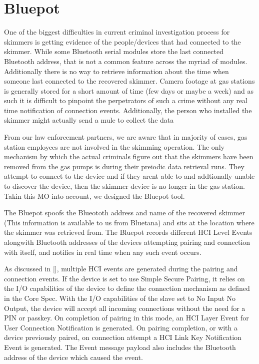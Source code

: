 
\section{Bluepot}
\label{sec:bluepot}

One of the biggest difficulties in current criminal investigation process for skimmers is getting evidence of the people/devices that had connected to the skimmer. While some Bluetooth serial modules store the last connected Bluetooth address, that is not a common feature across the myriad of modules. Additionally there is no way to retrieve information about the time when someone last connected to the recovered skimmer. Camera footage at gas stations is generally stored for a short amount of time (few days or maybe a week) and as such it is difficult to pinpoint the perpetrators of such a crime without any real time notification of connection events. Additionally, the person who installed the skimmer might actually send a mule to collect the data

From our law enforcement partners, we are aware that in majority of cases, gas station employees are not involved in the skimming operation. The only mechanism by which the actual criminals figure out that the skimmers have been removed from the gas pumps is during their preiodic data retrieval runs. They attempt to connect to the device and if they arent able to and addtionally unable to discover the device, then the skimmer device is no longer in the gas station. Takin this MO into account, we designed the Bluepot tool.

The Bluepot spoofs the Blueototh address and name of the recovered skimmer (This information is available to us from Bluetana) and sits at the location where the skimmer was retrieved from. The Bluepot records different HCI Level Events alongwith Bluetooth addresses of the devices attempting pairing and connection with itself, and notifies in real time when any such event occurs.

As discussed in [], multiple HCI events are generated during the pairing and connection events. If the device is set to use Simple Secure Pairing, it relies on the I/O capabilities of the device to define the connection mechanism as defined in the Core Spec. With the I/O capabilities of the slave set to No Input No Output, the device will accept all incoming connections without the need for a PIN or passkey. On completion of pairing in this mode, an HCI Layer Event for User Connection Notification is generated. On pairing completion, or with a device previously paired, on connection attempt a HCI Link Key Notification Event is generated. The Event message payload also includes the Bluetooth address of the device which caused the event.

